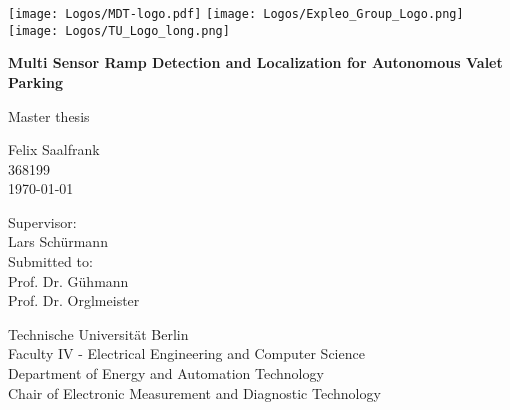 \begin{titlepage}
	\begin{center} %
		\texttt{[image: Logos/MDT-logo.pdf]}
		\hspace*{0.5cm}
		\texttt{[image: Logos/Expleo\_Group\_Logo.png]}
		\hspace*{0.5cm}
		\texttt{[image: Logos/TU\_Logo\_long.png]}
		\vspace*{1cm} %

		\Huge
		\textbf{Multi Sensor Ramp Detection and Localization for Autonomous Valet Parking}

		\vspace{0.5cm}
		Master thesis

		\vspace{1.5cm}
		\LARGE{Felix Saalfrank}\\
		\large 368199\\
		\vspace{1cm}
		\today

		\vspace{1.5cm}

		Supervisor:\\
		Lars Sch\"urmann\\
		\vspace*{0.3cm}
		Submitted to:\\
		Prof. Dr. G\"uhmann\\
		Prof. Dr. Orglmeister

		\vfill

		\vspace{0.8cm}

		Technische Universit\"at Berlin\\
		Faculty IV - Electrical Engineering and Computer Science\\
		Department of Energy and Automation Technology\\
		Chair of Electronic Measurement and Diagnostic Technology\\
	\end{center}
\end{titlepage}